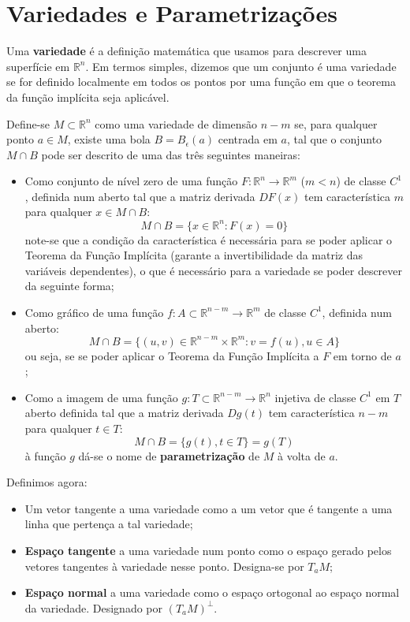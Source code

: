 \documentclass{article}
\newcommand{\R}{\mathbb{R}}
\begin{document}
\section{Variedades e Parametrizações}
Uma \textbf{variedade} é a definição matemática que usamos para descrever uma superfície em $\R^n$. Em termos simples, dizemos que um conjunto é uma variedade se for definido localmente em todos os pontos por uma função em que o teorema da função implícita seja aplicável.

Define-se $M \subset \R^n$ como uma variedade de dimensão $n-m$ se, para qualquer ponto $a \in M$, existe uma bola $B = B_\epsilon(a)$ centrada em $a$, tal que o conjunto $M \cap B$ pode ser descrito de uma das três seguintes maneiras:
\begin{itemize}
    \item Como conjunto de nível zero de uma função $F: \R^n \to \R^m$ ($m<n$) de classe $C^1$, definida num aberto tal que a matriz derivada $DF(x)$ tem característica $m$ para qualquer $x \in M \cap B$:
$$ M \cap B = \{ x \in \R^n: F(x) = 0 \} $$
note-se que a condição da característica é necessária para se poder aplicar o Teorema da Função Implícita (garante a invertibilidade da matriz das variáveis dependentes), o que é necessário para a variedade se poder descrever da seguinte forma;
    \item Como gráfico de uma função $f: A \subset \R^{n-m} \to \R^m$ de classe $C^1$, definida num aberto:
$$ M \cap B = \{ (u,v) \in \R^{n-m} \times \R^m: v=f(u), u \in A \} $$
ou seja, se se poder aplicar o Teorema da Função Implícita a $F$ em torno de $a$;
    \item Como a imagem de uma função $g: T \subset \R^{n-m} \to \R^n$ injetiva de classe $C^1$ em $T$ aberto definida tal que a matriz derivada $Dg(t)$ tem característica $n-m$ para qualquer $t \in T$:
$$ M \cap B = \{ g(t), t \in T \} = g(T) $$
à função $g$ dá-se o nome de \textbf{parametrização} de $M$ à volta de $a$.
\end{itemize}
Definimos agora:
\begin{itemize}
    \item Um vetor tangente a uma variedade como a um vetor que é tangente a uma linha que pertença a tal variedade;
    \item \textbf{Espaço tangente} a uma variedade num ponto como o espaço gerado pelos vetores tangentes à variedade nesse ponto. Designa-se por $T_aM$;
    \item \textbf{Espaço normal} a uma variedade como o espaço ortogonal ao espaço normal da variedade. Designado por $(T_aM)^\perp$.
\end{itemize}
\end{document}
